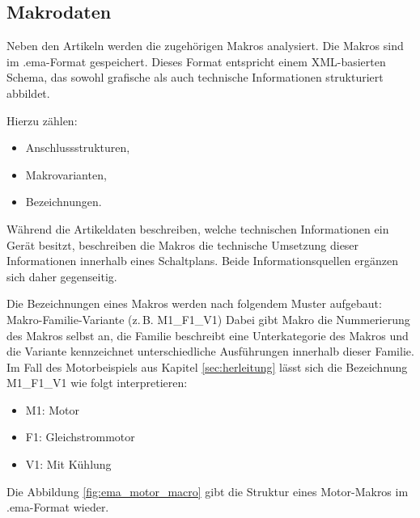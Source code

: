 \subsection{Makrodaten} 

Neben den Artikeln werden die zugehörigen Makros analysiert. Die Makros sind im .ema-Format gespeichert. 
Dieses Format entspricht einem XML-basierten Schema, das sowohl grafische als auch technische Informationen strukturiert abbildet. 

Hierzu zählen: 

\begin{itemize} 
    \item Anschlussstrukturen,  
    \item Makrovarianten,   
    \item Bezeichnungen. 
\end{itemize} 

Während die Artikeldaten beschreiben, welche technischen Informationen ein Gerät besitzt, 
beschreiben die Makros die technische Umsetzung dieser Informationen innerhalb eines Schaltplans. 
Beide Informationsquellen ergänzen sich daher gegenseitig. 

Die Bezeichnungen eines Makros werden nach folgendem Muster aufgebaut: Makro-Familie-Variante (z.\,B. M1\_F1\_V1)
Dabei gibt Makro die Nummerierung des Makros selbst an, die Familie beschreibt eine Unterkategorie des Makros und die Variante kennzeichnet unterschiedliche Ausführungen innerhalb dieser Familie.
Im Fall des Motorbeispiels aus Kapitel \ref{sec:herleitung} lässt sich die Bezeichnung M1\_F1\_V1 wie folgt interpretieren:

\begin{itemize}
    \item  M1: Motor
    \item  F1: Gleichstrommotor
    \item  V1: Mit Kühlung
\end{itemize}

Die Abbildung \ref{fig:ema_motor_macro} gibt die Struktur eines Motor-Makros im .ema-Format wieder.

